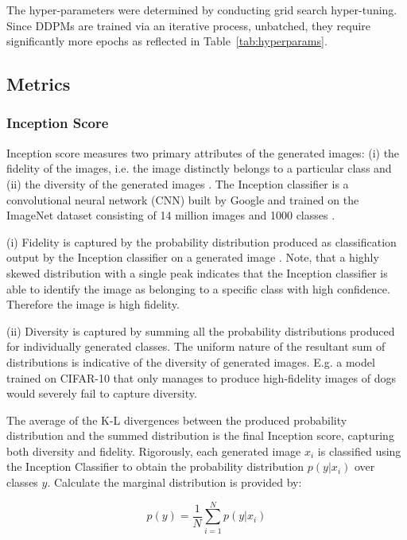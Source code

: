 \documentclass[%
 reprint,
 amsmath,amssymb,
 aps,
]{revtex4-2}
\begin{document}
The hyper-parameters were determined by conducting grid search hyper-tuning. Since DDPMs are trained via an iterative process, unbatched, they require significantly more epochs as reflected in Table~\ref{tab:hyperparams}.


\subsection{Metrics}
\label{metrics_}
\subsubsection{Inception Score}
Inception score measures two primary attributes of the generated images: (i) the fidelity of the images, i.e. the image distinctly belongs to a particular class and (ii) the diversity of the generated images \cite{mack_2019}. The Inception classifier is a convolutional neural network (CNN) built by Google and trained on the ImageNet dataset consisting of 14 million images and 1000 classes \cite{inception_model}.


(i) Fidelity is captured by the probability distribution produced as classification output by the Inception classifier on a generated image \cite{mack_2019}. Note, that a highly skewed distribution with a single peak indicates that the Inception classifier is able to identify the image as belonging to a specific class with high confidence. Therefore the image is high fidelity.



(ii) Diversity is captured by summing all the probability distributions produced for individually generated classes. The uniform nature of the resultant sum of distributions is indicative of the diversity of generated images. E.g. a model trained on CIFAR-10 that only manages to produce high-fidelity images of dogs would severely fail to capture diversity.



The average of the K-L divergences between the produced probability distribution and the summed distribution is the final Inception score, capturing both diversity and fidelity.
Rigorously, each generated image $x_i$ is classified using the Inception Classifier to obtain the probability distribution $p(y|x_i)$ over classes $y$\cite{isscore}. Calculate the marginal distribution is provided by: 

\begin{equation}
p(y) = \frac{1}{N} \sum_{i=1}^{N} p(y|x_i)
\end{equation}
\end{document}
